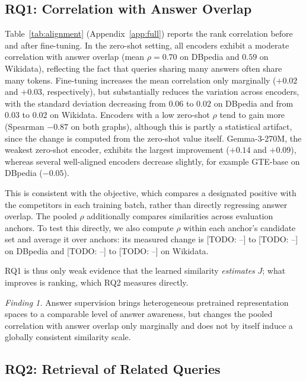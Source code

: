 \documentclass[runningheads]{llncs}
\newcommand{\hp}[1]{{\color{red!75!black}#1}}
\begin{document}
\subsection{RQ1: Correlation with Answer Overlap}
\label{sec:rq1}

Table~\ref{tab:alignment} (Appendix~\ref{app:full}) reports the rank
correlation before and after fine-tuning. In the zero-shot setting, all encoders exhibit a moderate
correlation with answer overlap (mean $\rho = 0.70$ on DBpedia and $0.59$ on
Wikidata), reflecting the fact that queries sharing many answers often share
many tokens. Fine-tuning increases the mean correlation only marginally
($+0.02$ and $+0.03$, respectively), but substantially reduces the variation
across encoders, with the standard deviation decreasing from $0.06$ to $0.02$
on DBpedia and from $0.03$ to $0.02$ on Wikidata. Encoders with a low
zero-shot $\rho$ tend to gain more (Spearman $-0.87$ on both graphs), although
this is partly a statistical artifact, since the change is computed from the
zero-shot value itself. Gemma-3-270M, the weakest zero-shot encoder, exhibits the largest improvement
($+0.14$ and $+0.09$), whereas several well-aligned encoders decrease
slightly, for example GTE-base on DBpedia ($-0.05$).

This is consistent with the objective, which compares a designated positive
with the competitors in each training batch, rather than directly regressing
answer overlap. The pooled $\rho$ additionally compares similarities across
evaluation anchors. To test this
directly, we also compute $\rho$ within each anchor's candidate set and
average it over anchors: its measured change is \hp{[TODO: --]} to \hp{[TODO: --]} on
DBpedia and \hp{[TODO: --]} to \hp{[TODO: --]} on Wikidata.

RQ1 is thus only weak evidence that the learned similarity
\emph{estimates} $J$; what improves is ranking, which RQ2 measures directly.

\textit{Finding 1.} Answer supervision brings heterogeneous
pretrained representation spaces to a comparable level of answer awareness,
but changes the pooled correlation with answer overlap only marginally and
does not by itself induce a globally consistent similarity scale.

\subsection{RQ2: Retrieval of Related Queries}
\label{sec:rq2}


\end{document}
